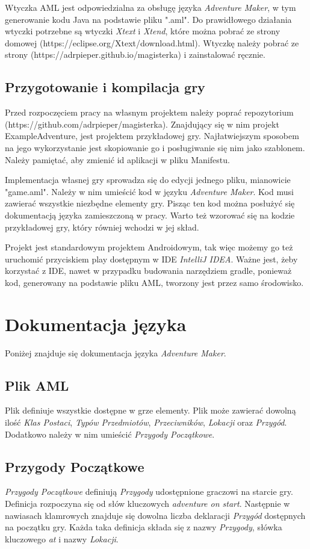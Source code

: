 \documentclass[openright]{xmgr}
\begin{document}
Wtyczka AML jest odpowiedzialna za obsługę języka \textit{Adventure Maker}, w tym generowanie kodu Java na podstawie pliku ".aml". Do prawidłowego działania wtyczki potrzebne są wtyczki \textit{Xtext} i \textit{Xtend}, które można pobrać ze strony domowej (https://eclipse.org/Xtext/download.html).
Wtyczkę należy pobrać ze strony (https://adrpieper.github.io/magisterka) i zainstalować ręcznie.

\section{Przygotowanie i kompilacja gry}
Przed rozpoczęciem pracy na własnym projektem należy poprać repozytorium (https://github.com/adrpieper/magisterka). Znajdujący się w nim projekt ExampleAdventure, jest projektem przykładowej gry. Najłatwiejszym sposobem na jego wykorzystanie jest skopiowanie go i posługiwanie się nim jako szablonem. Należy pamiętać, aby zmienić id aplikacji w pliku Manifestu.

Implementacja własnej gry sprowadza się do edycji jednego pliku, mianowicie "game.aml". Należy w nim umieścić kod w języku \textit{Adventure Maker}. Kod musi  zawierać wszystkie niezbędne elementy gry. Pisząc ten kod można posłużyć się dokumentacją języka zamieszczoną w pracy. Warto też wzorować się na kodzie przykładowej gry, który równiej wchodzi w jej skład.

Projekt jest standardowym projektem Androidowym, tak więc możemy go też uruchomić przyciskiem play dostępnym w IDE \textit{IntelliJ IDEA}. Ważne jest, żeby korzystać z IDE, nawet w przypadku budowania narzędziem gradle, ponieważ kod, generowany na podstawie pliku AML, tworzony jest przez samo środowisko.

\chapter{Dokumentacja języka} 
Poniżej znajduje się dokumentacja języka \textit{Adventure Maker}.

\section{Plik AML} 
Plik definiuje wszystkie dostępne w grze elementy. Plik może zawierać dowolną ilość \textit{Klas Postaci}, \textit{Typów Przedmiotów}, \textit{Przeciwników}, \textit{Lokacji} oraz \textit{Przygód}. Dodatkowo należy w nim umieścić \textit{Przygody Początkowe}. 

\section{Przygody Początkowe} 
\textit{Przygody Początkowe} definiują \textit{Przygody} udostępnione graczowi na starcie gry. Definicja rozpoczyna się od słów kluczowych \textit{adventure on start}. Następnie w nawiasach klamrowych znajduje się dowolna liczba deklaracji \textit{Przygód} dostępnych na początku gry.
Każda taka definicja składa się z nazwy \textit{Przygody}, słówka kluczowego \textit{at} i nazwy \textit{Lokacji}.
\end{document}
